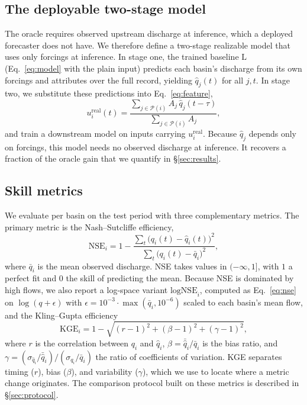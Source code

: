 \documentclass[11pt]{article}
\begin{document}
\subsection{The deployable two-stage model}
\label{sec:realizable}

The oracle requires observed upstream discharge at inference, which a deployed forecaster does not
have. We therefore define a two-stage realizable model that uses only forcings at inference. In
stage one, the trained baseline $\mathrm{L}$ (Eq.~\eqref{eq:model} with the plain input) predicts
each basin's discharge from its own forcings and attributes over the full record, yielding
$\hat{q}_j(t)$ for all $j,t$. In stage two, we substitute these predictions into
Eq.~\eqref{eq:feature},
\begin{equation}
\label{eq:realizable}
u_i^{\mathrm{real}}(t) =
\frac{\sum_{j\in\mathcal{P}(i)} A_j\, \hat{q}_j(t-\tau)}
     {\sum_{j\in\mathcal{P}(i)} A_j},
\end{equation}
and train a downstream model on inputs carrying $u_i^{\mathrm{real}}$. Because $\hat{q}_j$ depends
only on forcings, this model needs no observed discharge at inference. It recovers a fraction of the
oracle gain that we quantify in \S\ref{sec:results}.

\subsection{Skill metrics}
\label{sec:eval}

We evaluate per basin on the test period with three complementary metrics. The primary metric is the
Nash--Sutcliffe efficiency,
\begin{equation}
\label{eq:nse}
\mathrm{NSE}_i = 1 - \frac{\sum_t \big(q_i(t)-\hat{q}_i(t)\big)^2}{\sum_t \big(q_i(t)-\bar{q}_i\big)^2},
\end{equation}
where $\bar{q}_i$ is the mean observed discharge. NSE takes values in $(-\infty,1]$, with $1$ a
perfect fit and $0$ the skill of predicting the mean. Because NSE is dominated by high flows, we also report a log-space
variant $\mathrm{logNSE}_i$, computed as Eq.~\eqref{eq:nse} on $\log(q+\epsilon)$ with
$\epsilon = 10^{-3}\cdot\max(\bar{q}_i,10^{-6})$ scaled to each basin's mean flow, and the
Kling--Gupta efficiency
\begin{equation}
\label{eq:kge}
\mathrm{KGE}_i = 1 - \sqrt{(r-1)^2 + (\beta-1)^2 + (\gamma-1)^2},
\end{equation}
where $r$ is the correlation between $q_i$ and $\hat{q}_i$, $\beta=\bar{\hat q}_i/\bar q_i$ is the
bias ratio, and $\gamma=(\sigma_{\hat q_i}/\bar{\hat q}_i)/(\sigma_{q_i}/\bar q_i)$ the ratio of
coefficients of variation. KGE separates timing ($r$), bias ($\beta$), and variability ($\gamma$),
which we use to locate where a metric change originates. The comparison protocol built on these
metrics is described in \S\ref{sec:protocol}.
\end{document}
